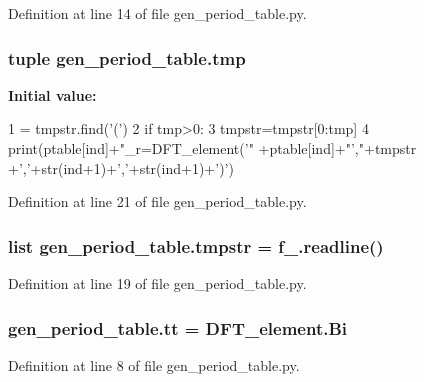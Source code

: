 Definition at line 14 of file gen\+\_\+period\+\_\+table.\+py.

\hypertarget{namespacegen__period__table_ad3db3c645f8d69689e48ee4bc93fc478}{
\subsubsection[{tmp}]{\setlength{\rightskip}{0pt plus 5cm}tuple gen\+\_\+period\+\_\+table.\+tmp}}\label{namespacegen__period__table_ad3db3c645f8d69689e48ee4bc93fc478}
{\bfseries Initial value\+:}
\begin{DoxyCode}
1 = tmpstr.find(\textcolor{stringliteral}{'('})
2     \textcolor{keywordflow}{if} tmp>0:
3         tmpstr=tmpstr[0:tmp]
4     print(ptable[ind]+\textcolor{stringliteral}{"\_r=DFT\_element('"} +ptable[ind]+\textcolor{stringliteral}{"',"}+tmpstr +\textcolor{stringliteral}{','}+str(ind+1)+\textcolor{stringliteral}{','}+str(ind+1)+\textcolor{stringliteral}{')'})
\end{DoxyCode}


Definition at line 21 of file gen\+\_\+period\+\_\+table.\+py.

\hypertarget{namespacegen__period__table_ab86a6d8ecb978ca7313bcc61f8789d5e}{
\subsubsection[{tmpstr}]{\setlength{\rightskip}{0pt plus 5cm}list gen\+\_\+period\+\_\+table.\+tmpstr = f\+\_\+.\+readline()}}\label{namespacegen__period__table_ab86a6d8ecb978ca7313bcc61f8789d5e}


Definition at line 19 of file gen\+\_\+period\+\_\+table.\+py.

\hypertarget{namespacegen__period__table_a92f4e05a0c7536c4fb08ffffc227dc86}{
\subsubsection[{tt}]{\setlength{\rightskip}{0pt plus 5cm}gen\+\_\+period\+\_\+table.\+tt = D\+F\+T\+\_\+element.\+Bi}}\label{namespacegen__period__table_a92f4e05a0c7536c4fb08ffffc227dc86}


Definition at line 8 of file gen\+\_\+period\+\_\+table.\+py.

